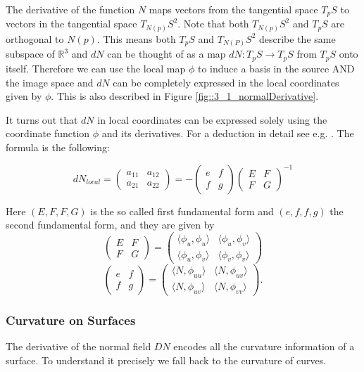 The derivative of the function $N$ maps vectors from the tangential space $T_pS$ to vectors in the tangential space $T_{N(p)}S^2$. Note that both $T_{N(p)}S^2$ and $T_pS$ are orthogonal to $N(p)$. This means both $T_pS$ and $T_{N(P)}S^2$ describe the same subspace of $\mathbb R^3$ and $dN$ can be thought of as a map $dN: T_pS \rightarrow T_pS$ from $T_pS$ onto itself. Therefore we can use the local map $\phi$ to induce a basis in the source AND the image space and $dN$ can be completely expressed in the local coordinates given by $\phi$. This is also described in Figure \ref{fig::3_1_normalDerivative}.


It turns out that $dN$ in local coordinates can be expressed solely using the coordinate function $\phi$ and its derivatives. For a deduction in detail see e.g. . The formula is the following:

\[dN_{local} = \begin{pmatrix} a_{11} & a_{12} \\ a_{21} & a_{22} \end{pmatrix} = - \begin{pmatrix} e & f \\ f & g \end{pmatrix} \begin{pmatrix} E & F \\ F & G \end{pmatrix}^{-1}\]

Here $(E,F,F,G)$ is the so called first fundamental form and $(e,f,f,g)$ the second fundamental form, and they are given by
\[\begin{pmatrix} E & F \\ F & G \end{pmatrix} = \begin{pmatrix} \langle \phi_u, \phi_u \rangle & \langle \phi_u, \phi_v \rangle \\ 
							\langle \phi_u, \phi_v \rangle & \langle \phi_v, \phi_v \rangle \end{pmatrix}\]
\[\begin{pmatrix} e & f \\ f & g \end{pmatrix} = \begin{pmatrix} \langle N, \phi_{uu} \rangle & \langle N, \phi_{uv} \rangle \\ 
							\langle N, \phi_{uv} \rangle & \langle N, \phi_{vv} \rangle \end{pmatrix}.\]


\subsubsection{Curvature on Surfaces}
The derivative of the normal field $DN$ encodes all the curvature information of a surface. To understand it precisely we fall back to the curvature of curves.


